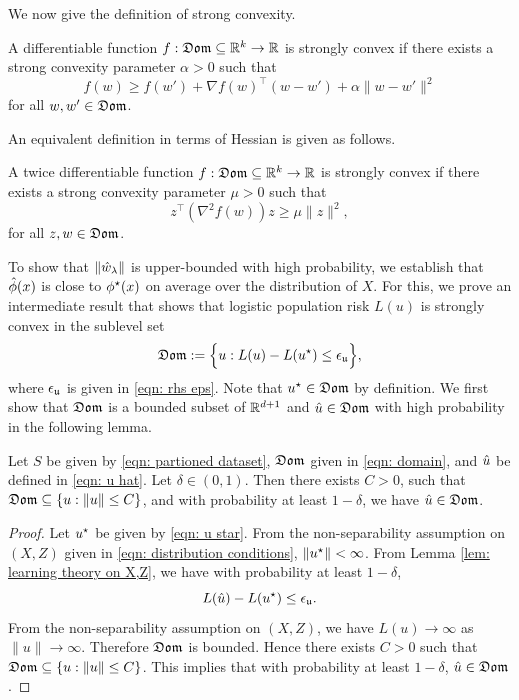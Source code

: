 We now give the definition of strong convexity.

\begin{defn}\label{defn: strong convex series}
    A differentiable function $f: \mathfrak{Dom} \subseteq \mathbb{R}^k  \rightarrow \mathbb{R}$ is strongly convex if there exists a strong convexity parameter $\alpha > 0$ such that
    \begin{equation*}
        f(w) \geq f(w') + \nabla f(w)^\top (w-w') + \alpha\|w-w'\|^2
    \end{equation*}
    for all  $w, w' \in \mathfrak{Dom} $.
\end{defn}
An equivalent definition in terms of Hessian is given as follows.
\begin{defn}\label{defn: strong convex hessian}
    A twice differentiable function $f: \mathfrak{Dom} \subseteq \mathbb{R}^k \rightarrow \mathbb{R}$ is strongly convex if there exists a strong convexity parameter $\mu > 0$ such that
    \[z^\top (\nabla^2 f(w)) z \geq \mu\|z\|^2,\]
    for all $z,w \in \mathfrak{Dom}$.
\end{defn}

To show that $\|\hat{w}_\lambda\|$ is  upper-bounded with high probability, we establish that $\hat{\phi}(x)$ is close to $\phi^\star(x)$ on average over the distribution of $X$. For this, we prove an intermediate result that shows that logistic population risk $L(u)$ is strongly convex in 
the sublevel set
    \begin{equation}\label{eqn: domain}
        \mathfrak{Dom} := \Big\{u: L(u) - L(u^\star) \leq \epsilon_{\mathfrak{u}} \Big\},
    \end{equation}
where $\epsilon_{\mathfrak{u}}$ is given in \eqref{eqn: rhs eps}.
Note that $u^\star \in \mathfrak{Dom}$ by definition.
We first show that $\mathfrak{Dom}$ is a bounded subset of $\mathbb{R}^{d+1}$ and $\hat{u} \in \mathfrak{Dom}$ with high probability in the following lemma.

\begin{lem}\label{lem: norm bound on u hat}
    Let $S$ be given by \eqref{eqn: partioned dataset}, $\mathfrak{Dom}$ given in \eqref{eqn: domain}, and $\hat{u}$ be defined in \eqref{eqn: u hat}. Let $\delta \in (0,1)$. Then there exists $C > 0$, such that $\mathfrak{Dom} \subseteq \{u: \|u\| \leq C\}$, and with probability at least $1-\delta$, we have
    $\hat{u} \in \mathfrak{Dom}$.
\end{lem}

\begin{proof}
    Let $u^\star$ be given by \eqref{eqn: u star}. From the non-separability assumption on $(X,Z)$ given in \eqref{eqn: distribution conditions}, $\|u^\star\| < \infty$. From Lemma \ref{lem: learning theory on X,Z}, we have with probability at least $1-\delta$,
    \begin{equation}\label{eqn: uh us gap in risk}
        L(\hat{u}) - L(u^\star) \leq \epsilon_{\mathfrak{u}}.
    \end{equation}
    From the non-separability assumption on $(X,Z)$, we have $L(u) \to \infty$ as $\|u\| \to \infty$. Therefore $\mathfrak{Dom}$ is bounded. Hence there exists $C > 0$ such that $\mathfrak{Dom}\subseteq \{u: \|u\| \leq C\}$. This implies that with probability at least $1-\delta$, $\hat{u} \in \mathfrak{Dom}$.
\end{proof}

